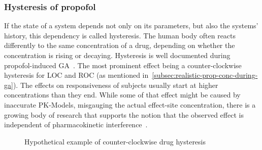 \subsubsection{Hysteresis of propofol}

If the state of a system depends not only on its parameters, but also the systems' history,
this dependency is called hysteresis.
The human body often reacts differently to the same concentration of a drug,
depending on whether the concentration is rising or decaying.
Hysteresis is well documented during propofol-induced GA~\cite{kuizenga_quantitative_1998,
    iwakiri_individual_2005,
    sepulveda_evidence_2018,ferreira_patterns_2020, su_hysteresis_2020}.
The most prominent effect being a counter-clockwise hysteresis for LOC and ROC (as mentioned
in~\ref{subsec:realistic-prop-conc-during-ga}).
The effects on responsiveness of subjects usually start at higher concentrations than they end.
While some of that effect might be caused by inaccurate PK-Models,
misgauging the actual effect-site concentration,
there is a growing body of research that supports the notion that the observed effect is independent of
pharmacokinetic interference~\cite{hutt_progress_2011, su_hysteresis_2020}.
\begin{figure}[H]
    \centering
    \pgfplotsset{compat = newest}

    \caption{Hypothetical example of counter-clockwise drug hysteresis}
    \label{fig:hystersis_in_general}
\end{figure}
